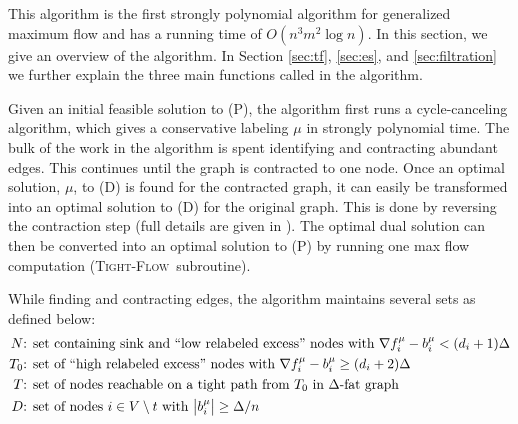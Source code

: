 \documentclass[11pt]{article}
\theoremstyle{definition}
\theoremstyle{definition}
\newcommand{\fu}{f^{\mu}}
\newcommand{\nfiu}{\nabla \fu_i}
\newcommand{\biu}{b_{i}^{\mu}}
\newcommand{\tf}{\textsc{Tight-Flow}}
\newcommand{\todo}[1]{}%
\begin{document}
    
   This algorithm is the first strongly polynomial algorithm for generalized maximum flow and has a running time of $O(n^3 m^2 \log n)$. In this section, we give an overview of the algorithm. In Section \ref{sec:tf}, \ref{sec:es}, and \ref{sec:filtration} we further explain the three main functions called in the algorithm. %
	     
	Given an initial feasible solution to (P), the algorithm first runs a cycle-canceling algorithm,
		which gives a conservative labeling $\mu$ in strongly polynomial
		time\todo{?}. The bulk of the
    work in the algorithm is spent identifying and contracting abundant edges. This continues
    until the graph is contracted to one node. Once an optimal solution, $\mu$, to (D)
    is found for the contracted graph, it can easily be transformed into an optimal solution to
    (D) for the original graph. This is done by reversing the contraction step (full details
    are given in \cite{article}). The optimal dual solution can then be converted into an optimal solution to (P) by running one max flow computation (\tf\ subroutine). %
	
	While finding and contracting edges, the algorithm maintains several sets as defined below:
	\begin{align*}
	N&\text{: set containing sink and ``low relabeled excess'' nodes with }
            \nfiu - \biu < (d_i +1)\Delta \\
	T_0&\text{: set of ``high relabeled excess'' nodes with } \nfiu - \biu \geq (d_i + 2)\Delta \\
	T&\text{: set of nodes reachable on a tight path from $T_0$ in $\Delta$-fat graph} \\ 
	D&\text{: set of nodes $i \in V \setminus t$ with } \abs{b_i^\mu} \geq \Delta / n
	\end{align*}
	
\end{document}
